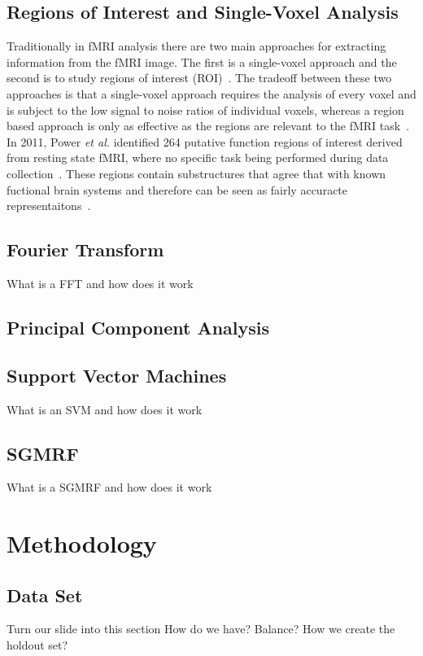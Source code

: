 \documentclass{article} %
\begin{document}
\subsection{Regions of Interest and Single-Voxel Analysis}
Traditionally in fMRI analysis there are two main approaches for extracting
information from the fMRI image. The first is a single-voxel approach and 
the second is to study regions of interest (ROI)~\cite{heller2006cluster}. 
The tradeoff between these two approaches is that a single-voxel approach
requires the analysis of every voxel and is subject to the low signal to 
noise ratios of individual voxels, whereas a region based approach is only
as effective as the regions are relevant to the fMRI 
task~\cite{heller2006cluster}. In 2011, Power \emph{et al.} identified 264 
putative function regions of interest derived from resting state fMRI, where 
no specific task being performed during data collection~\cite{Power_2011}. 
These regions contain substructures that agree that with known fuctional 
brain systems and therefore can be seen as fairly accuracte 
representaitons~\cite{Power_2011}.

\subsection{Fourier Transform}
What is a FFT and how does it work

\subsection{Principal Component Analysis}

\subsection{Support Vector Machines}
What is an SVM and how does it work

\subsection{SGMRF}
What is a SGMRF and how does it work


\section{Methodology}

\subsection{Data Set}
Turn our slide into this section
How do we have? Balance? 
How we create the holdout set?
\end{document}

